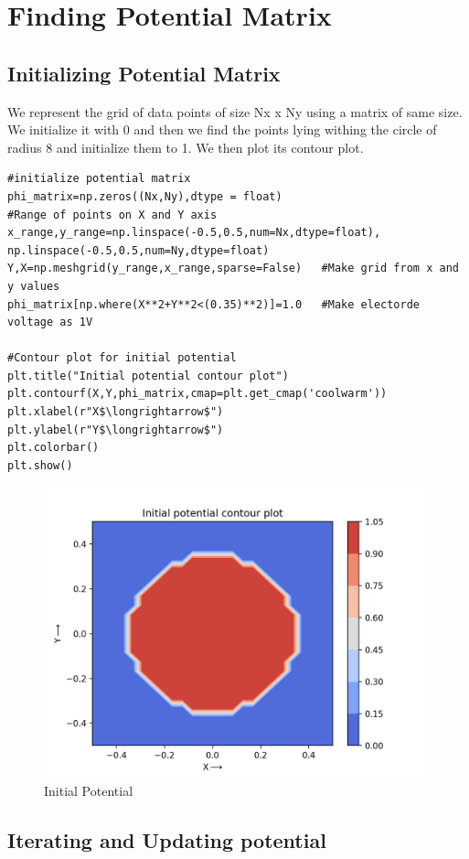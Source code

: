\documentclass[11pt, a4paper]{article}
\begin{document}
\section{Finding Potential Matrix}
\subsection{ Initializing Potential Matrix}
We represent the grid of data points of size Nx x Ny using a matrix of same size. We initialize it with 0 and then we find the points lying withing the circle of radius 8 and initialize them to 1. We then plot its contour plot.
\begin{lstlisting}
#initialize potential matrix
phi_matrix=np.zeros((Nx,Ny),dtype = float)
#Range of points on X and Y axis
x_range,y_range=np.linspace(-0.5,0.5,num=Nx,dtype=float), np.linspace(-0.5,0.5,num=Ny,dtype=float)
Y,X=np.meshgrid(y_range,x_range,sparse=False)   #Make grid from x and y values
phi_matrix[np.where(X**2+Y**2<(0.35)**2)]=1.0   #Make electorde voltage as 1V

#Contour plot for initial potential
plt.title("Initial potential contour plot")
plt.contourf(X,Y,phi_matrix,cmap=plt.get_cmap('coolwarm'))
plt.xlabel(r"X$\longrightarrow$")
plt.ylabel(r"Y$\longrightarrow$")
plt.colorbar()
plt.show()
\end{lstlisting}
\begin{figure}[h!]
\centering
\includegraphics[scale=0.6]{Fig-1.png}
\caption{Initial Potential}
\label{fig:initial Potential}
\end{figure}
\newpage

\subsection{Iterating and Updating potential}
\end{document}
